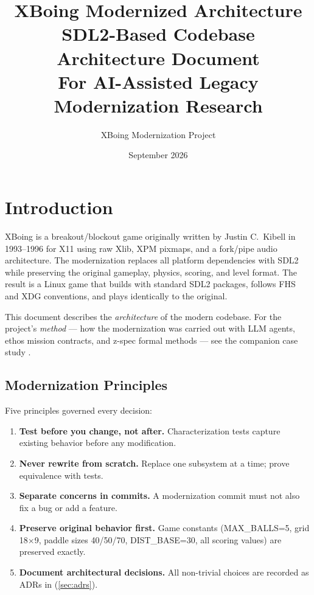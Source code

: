 \documentclass[11pt,a4paper]{article}
\title{%
    \textbf{XBoing Modernized Architecture}\\[0.5em]
    \large SDL2-Based Codebase Architecture Document\\
    \large For AI-Assisted Legacy Modernization Research
}
\author{XBoing Modernization Project}
\date{September 2026}
\begin{document}
\maketitle

\tableofcontents
\newpage

\section{Introduction}
\label{sec:introduction}

XBoing is a breakout/blockout game originally written by Justin C.\ Kibell in 1993--1996 for X11 using raw Xlib, XPM pixmaps, and a fork/pipe audio architecture. The modernization replaces all platform dependencies with SDL2 while preserving the original gameplay, physics, scoring, and level format. The result is a Linux game that builds with standard SDL2 packages, follows FHS and XDG conventions, and plays identically to the original.

This document describes the \emph{architecture} of the modern codebase. For the project's \emph{method} --- how the modernization was carried out with LLM agents, ethos mission contracts, and z-spec formal methods --- see the companion case study .

\subsection{Modernization Principles}
\label{sec:principles}

Five principles governed every decision:

\begin{enumerate}[nosep]
    \item \textbf{Test before you change, not after.} Characterization tests capture existing behavior before any modification.
    \item \textbf{Never rewrite from scratch.} Replace one subsystem at a time; prove equivalence with tests.
    \item \textbf{Separate concerns in commits.} A modernization commit must not also fix a bug or add a feature.
    \item \textbf{Preserve original behavior first.} Game constants (MAX\_BALLS=5, grid 18$\times$9, paddle sizes 40/50/70, DIST\_BASE=30, all scoring values) are preserved exactly.
    \item \textbf{Document architectural decisions.} All non-trivial choices are recorded as ADRs in  (\cref{sec:adrs}).
\end{enumerate}
\end{document}
